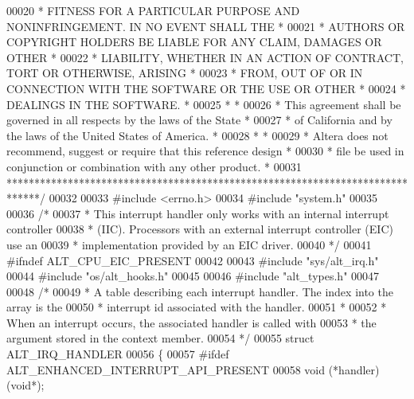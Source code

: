 \begin{DoxyCode}
00020 \textcolor{comment}{* FITNESS FOR A PARTICULAR PURPOSE AND NONINFRINGEMENT. IN NO EVENT SHALL THE *}
00021 \textcolor{comment}{* AUTHORS OR COPYRIGHT HOLDERS BE LIABLE FOR ANY CLAIM, DAMAGES OR OTHER      *}
00022 \textcolor{comment}{* LIABILITY, WHETHER IN AN ACTION OF CONTRACT, TORT OR OTHERWISE, ARISING     *}
00023 \textcolor{comment}{* FROM, OUT OF OR IN CONNECTION WITH THE SOFTWARE OR THE USE OR OTHER         *}
00024 \textcolor{comment}{* DEALINGS IN THE SOFTWARE.                                                   *}
00025 \textcolor{comment}{*                                                                             *}
00026 \textcolor{comment}{* This agreement shall be governed in all respects by the laws of the State   *}
00027 \textcolor{comment}{* of California and by the laws of the United States of America.              *}
00028 \textcolor{comment}{*                                                                             *}
00029 \textcolor{comment}{* Altera does not recommend, suggest or require that this reference design    *}
00030 \textcolor{comment}{* file be used in conjunction or combination with any other product.          *}
00031 \textcolor{comment}{******************************************************************************/}
00032 
00033 \textcolor{preprocessor}{#include <errno.h>}
00034 \textcolor{preprocessor}{#include "system.h"}
00035 
00036 \textcolor{comment}{/*}
00037 \textcolor{comment}{ * This interrupt handler only works with an internal interrupt controller}
00038 \textcolor{comment}{ * (IIC). Processors with an external interrupt controller (EIC) use an }
00039 \textcolor{comment}{ * implementation provided by an EIC driver.}
00040 \textcolor{comment}{ */}
00041 \textcolor{preprocessor}{#ifndef ALT\_CPU\_EIC\_PRESENT}
00042 
00043 \textcolor{preprocessor}{#include "sys/alt_irq.h"}
00044 \textcolor{preprocessor}{#include "os/alt_hooks.h"}
00045 
00046 \textcolor{preprocessor}{#include "alt_types.h"}
00047 
00048 \textcolor{comment}{/*}
00049 \textcolor{comment}{ * A table describing each interrupt handler. The index into the array is the}
00050 \textcolor{comment}{ * interrupt id associated with the handler. }
00051 \textcolor{comment}{ *}
00052 \textcolor{comment}{ * When an interrupt occurs, the associated handler is called with}
00053 \textcolor{comment}{ * the argument stored in the context member.}
00054 \textcolor{comment}{ */}
00055 \textcolor{keyword}{struct }ALT_IRQ_HANDLER
00056 \{
00057 \textcolor{preprocessor}{#ifdef ALT\_ENHANCED\_INTERRUPT\_API\_PRESENT}
00058   void (*handler)(\textcolor{keywordtype}{void}*);

\end{DoxyCode}
